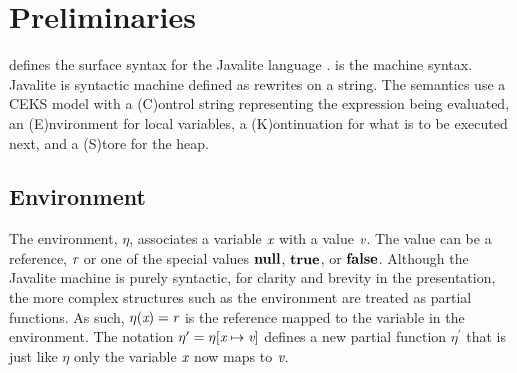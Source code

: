 \section{Preliminaries}

 defines the surface syntax for the
Javalite language \cite{saints-MS}.  is the
machine syntax. Javalite is syntactic machine defined as rewrites on a
string. The semantics use a CEKS model with a (C)ontrol string
representing the expression being evaluated, an (E)nvironment for
local variables, a (K)ontinuation for what is to be executed next, and
a (S)tore for the heap.



\subsection{Environment}
The environment, $\eta$, associates a variable $\emph{x}$ with a
value $\emph{v}$. The value can be a reference, $\emph{r}$ or one of
the special values $\textbf{null}$, $\textbf{true}$, or
$\textbf{false}$. Although the Javalite machine is purely syntactic, for
clarity and brevity in the presentation, the more complex structures
such as the environment are treated as partial functions. As such,
$\eta(\emph{x}) = \emph{r}$ is the reference mapped to the variable
in the environment. The notation $\eta^\prime = \eta[\emph{x} \mapsto
  \emph{v}]$ defines a new partial function $\eta^\prime$ that is
just like $\eta$ only the variable $\emph{x}$ now maps to
$\emph{v}$.



